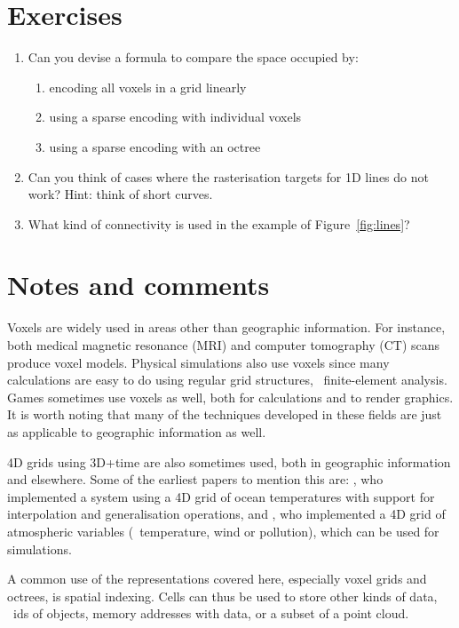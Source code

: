 %
\section{Exercises}

\begin{enumerate}
	\item Can you devise a formula to compare the space occupied by:
	\begin{enumerate}
		\item encoding all voxels in a grid linearly
		\item using a sparse encoding with individual voxels
		\item using a sparse encoding with an octree
	\end{enumerate}
	\item Can you think of cases where the rasterisation targets for 1D lines do not work? Hint: think of short curves.
	\item What kind of connectivity is used in the example of Figure~\ref{fig:lines}?
\end{enumerate}



%
\section{Notes and comments}

Voxels are widely used in areas other than geographic information.
For instance, both medical magnetic resonance (MRI) and computer tomography (CT) scans produce voxel models.
Physical simulations also use voxels since many calculations are easy to do using regular grid structures, \eg\ finite-element analysis.
Games sometimes use voxels as well, both for calculations and to render graphics.
It is worth noting that many of the techniques developed in these fields are just as applicable to geographic information as well.

4D grids using 3D+time are also sometimes used, both in geographic information and elsewhere.
Some of the earliest papers to mention this are: \citet{Mason94}, who implemented a system using a 4D grid of ocean temperatures with support for interpolation and generalisation operations, and \citet{Bernard98}, who implemented a 4D grid of atmospheric variables (\eg\ temperature, wind or pollution), which can be used for simulations.

A common use of the representations covered here, especially voxel grids and octrees, is spatial indexing.
Cells can thus be used to store other kinds of data, \eg\ ids of objects, memory addresses with data, or a subset of a point cloud.

